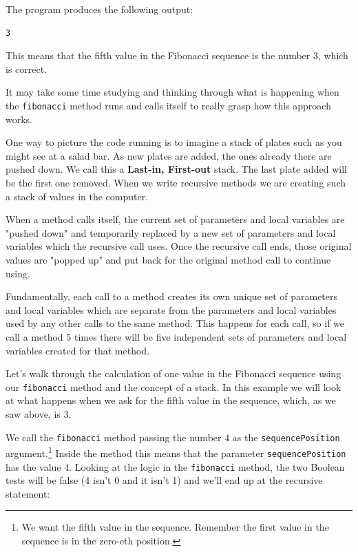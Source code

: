 The program produces the following output:

\beforeverb
\begin{verbatim}
3
\end{verbatim}
\afterverb

This means that the fifth value in the Fibonacci sequence is the number 3, which is correct.

It may take some time studying and thinking through what is happening when the \texttt{fibonacci} method runs and calls itself to really grasp how this approach works.

One way to picture the code running is to imagine a stack of plates such as you might see at a salad bar. As new plates are added, the ones already there are pushed down. We call this a \textbf{Last-in, First-out} stack. The last plate added will be the first one removed. When we write recursive methods we are creating such a stack of values in the computer.


When a method calls itself, the current set of parameters and local variables are "pushed down" and temporarily replaced by a new set of parameters and local variables which the recursive call uses. Once the recursive call ends, those original values are "popped up" and put back for the original method call to continue using.

Fundamentally, each call to a method creates its own unique set of parameters and local variables which are separate from the parameters and local variables used by any other calls to the same method. This happens for each call, so if we call a method 5 times there will be five independent sets of parameters and local variables created for that method.

Let's walk through the calculation of one value in the Fibonacci sequence using our \texttt{fibonacci} method and the concept of a stack. In this example we will look at what happens when we ask for the fifth value in the sequence, which, as we saw above, is 3.

We call the \texttt{fibonacci} method passing the number 4 as the \texttt{sequencePosition} argument.\footnote{We want the fifth value in the sequence. Remember the first value in the sequence is in the zero-eth position.} Inside the method this means that the parameter \texttt{sequencePosition} has the value 4. Looking at the logic in the \texttt{fibonacci} method, the two Boolean tests will be false (4 isn't 0 and it isn't 1) and we'll end up at the recursive statement:

